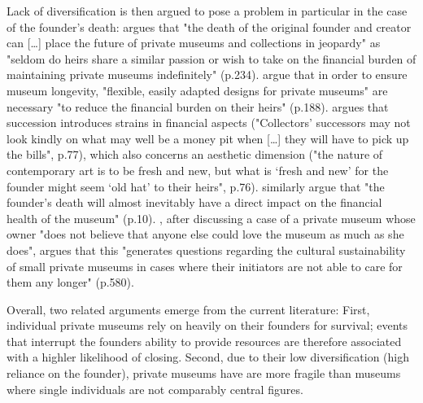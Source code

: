 \documentclass[12pt]{article}
\begin{document}
Lack of diversification is then argued to pose a problem in particular in the case of the founder's death:
\textcite{Walker_2019_collector} argues that "the death of the original founder and creator can [\ldots{}] place the future of private museums and collections in jeopardy" as "seldom do heirs share a similar passion or wish to take on the financial burden of maintaining private museums indefinitely" (p.234). 
\textcite{Bechtler_Imhof_2018_future} argue that in order to ensure museum longevity, "flexible, easily adapted designs for private museums" are necessary "to reduce the financial burden on their heirs" (p.188).
\textcite{Adam_2021_rise} argues that succession introduces strains in financial aspects ("Collectors’ successors may not look kindly on what may well be a money pit when [\ldots{}] they will have to pick up the bills", p.77), which also concerns an aesthetic dimension ("the nature of contemporary art is to be fresh and new, but what is ‘fresh and new’ for the founder might seem ‘old hat’ to their heirs", p.76).
\textcite{Velthuis_Gera_2024_fragility} similarly argue that "the founder’s death will almost inevitably have a direct impact on the financial health of the museum" (p.10).
\cite{StylianouLambert_etal_2014_museums}, after discussing a case of a private museum whose owner "does not believe that anyone else could love the museum as much as she does", argues that this "generates questions regarding the cultural sustainability of small private museums in cases where their initiators are not able to care for them any longer" (p.580).



Overall, two related arguments emerge from the current literature:
First, individual private museums rely on heavily on their founders for survival; events that interrupt the founders ability to provide resources are therefore associated with a highler likelihood of closing.
Second, due to their low diversification (high reliance on the founder), private museums have are more fragile than museums where single individuals are not comparably central figures.
\end{document}
